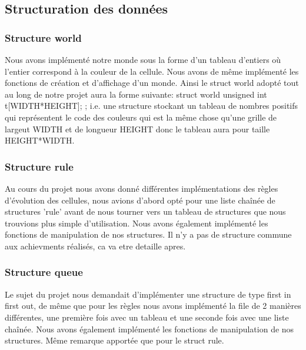 \documentclass{article}
\begin{document}
{{{        }
    
    
    }
    \bigskip
    \subsection{Structuration des données}
        {
        \subsubsection{Structure world}
            {
            Nous avons implémenté notre monde sous la forme d'un tableau d'entiers où l'entier correspond à la couleur de la cellule. Nous avons de même implémenté les fonctions de création et d'affichage d'un monde. Ainsi le struct world adopté tout au long de notre projet aura la forme suivante:
            struct world {
            unsigned int t[WIDTH*HEIGHT];
            };
            i.e. une structure stockant un tableau de nombres positifs qui représentent le code des couleurs qui est la même chose qu'une grille de largeut WIDTH et de longueur HEIGHT donc le tableau aura pour taille HEIGHT*WIDTH.
           
            }
        \subsubsection{Structure rule}
            {
            Au cours du projet nous avons donné différentes implémentations des règles d'évolution des cellules, nous avions d'abord opté pour une liste chaînée de structures 'rule' avant de nous tourner vers un tableau de structures que nous trouvions plus simple d'utilisation. Nous avons également implémenté les fonctions de manipulation de nos structures. Il n'y a pas de structure commune aux achievments réalisés, ca va etre detaille apres.
           
            }
        \subsubsection{Structure queue}
            {
            Le sujet du projet nous demandait d'implémenter une structure de type first in first out, de même que pour les règles nous avons implémenté la file de 2 manières différentes, une première fois avec un tableau et une seconde fois avec une liste chaînée. Nous avons également implémenté les fonctions de manipulation de nos structures. Même remarque apportée que pour le struct rule.
             
            }
    
    
    
        }
    
    
    
    
    
    }
\end{document}
